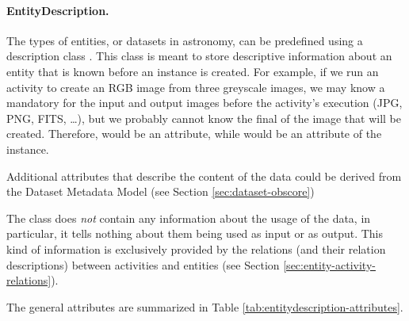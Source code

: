 \paragraph{EntityDescription.}
The types of entities, or datasets in astronomy, can be predefined using a
description class . This class is meant to store
descriptive information %
about an entity that is known before an  instance is created.
For example, if we run an activity to create an RGB image from three greyscale
images, we may know a mandatory  for the input and output
images before the activity's execution (JPG, PNG, FITS, \ldots), but we probably
cannot know the final  of the image  that will be created.
Therefore,  would be an  attribute,
while  would be an attribute of the  instance. 

Additional attributes that describe the content of the data could be derived from 
the Dataset Metadata Model (see Section \ref{sec:dataset-obscore})

The  class does \emph{not} contain any information about the
usage of the data, in particular, it tells nothing about them being used as
input or as output. This kind of information is exclusively provided by the
relations (and their relation descriptions) between activities and entities
(see Section \ref{sec:entity-activity-relations}).

The  general attributes are summarized in Table 
\ref{tab:entitydescription-attributes}.



